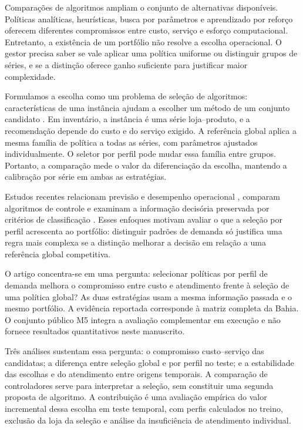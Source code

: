 \documentclass[preprint,12pt]{elsarticle}
\begin{document}
Comparações de algoritmos ampliam o conjunto de alternativas disponíveis. Políticas analíticas, heurísticas, busca por parâmetros e aprendizado por reforço oferecem diferentes compromissos entre custo, serviço e esforço computacional. Entretanto, a existência de um portfólio não resolve a escolha operacional. O gestor precisa saber se vale aplicar uma política uniforme ou distinguir grupos de séries, e se a distinção oferece ganho suficiente para justificar maior complexidade.

Formulamos a escolha como um problema de seleção de algoritmos: características de uma instância ajudam a escolher um método de um conjunto candidato \cite{rice1976,Kotthoff2014AlgorithmSelection}. Em inventário, a instância é uma série loja--produto, e a recomendação depende do custo e do serviço exigido. A referência global aplica a mesma família de política a todas as séries, com parâmetros ajustados individualmente. O seletor por perfil pode mudar essa família entre grupos. Portanto, a comparação mede o valor da diferenciação da escolha, mantendo a calibração por série em ambas as estratégias.

Estudos recentes relacionam previsão e desempenho operacional \cite{sca_f81ad2b3e023}, comparam algoritmos de controle \cite{sca_27e994c54848} e examinam a informação decisória preservada por critérios de classificação \cite{sca_c5c06dcbc9e5}. Esses enfoques motivam avaliar o que a seleção por perfil acrescenta ao portfólio: distinguir padrões de demanda só justifica uma regra mais complexa se a distinção melhorar a decisão em relação a uma referência global competitiva.

O artigo concentra-se em uma pergunta: selecionar políticas por perfil de demanda melhora o compromisso entre custo e atendimento frente à seleção de uma política global? As duas estratégias usam a mesma informação passada e o mesmo portfólio. A evidência reportada corresponde à matriz completa da Bahia. O conjunto público M5 integra a avaliação complementar em execução e não fornece resultados quantitativos neste manuscrito.

Três análises sustentam essa pergunta: o compromisso custo--serviço das candidatas; a diferença entre seleção global e por perfil no teste; e a estabilidade das escolhas e do atendimento entre origens temporais. A comparação de controladores serve para interpretar a seleção, sem constituir uma segunda proposta de algoritmo. A contribuição é uma avaliação empírica do valor incremental dessa escolha em teste temporal, com perfis calculados no treino, exclusão da loja da seleção e análise da insuficiência de atendimento individual.
\end{document}

